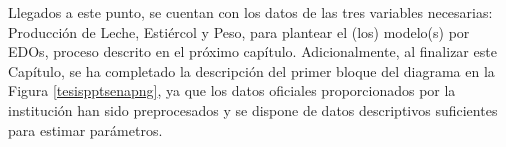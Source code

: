 Llegados a este punto, se cuentan con los datos de las tres variables necesarias: Producción de Leche, Estiércol y Peso, para plantear el (los) modelo(s) por EDOs, proceso descrito en el próximo capítulo. Adicionalmente, al finalizar este Capítulo, se ha completado la descripción del primer bloque del diagrama en la Figura \ref{tesispptsenapng}, ya que los datos oficiales proporcionados por la institución han sido preprocesados y se dispone de datos descriptivos suficientes para estimar parámetros. 
